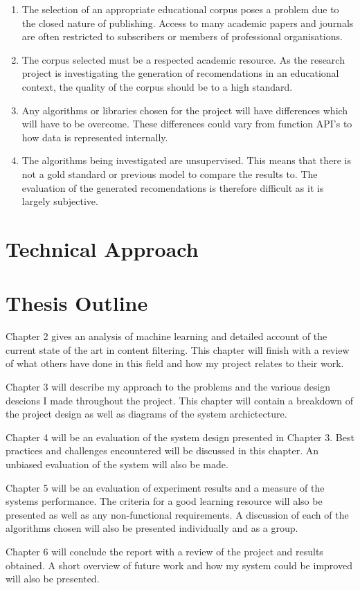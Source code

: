 \begin{enumerate}
    \item The selection of an appropriate educational corpus poses a problem due to the closed nature of publishing.
    Access to many academic papers and journals are often restricted to subscribers or members of professional organisations.

    \item The corpus selected must be a respected academic resource.
    As the research project is investigating the generation of recomendations in an educational context, the quality of the corpus should be to a high standard.

    \item Any algorithms or libraries chosen for the project will have differences which will have to be overcome.
    These differences could vary from function API's to how data is represented internally.

    \item The algorithms being investigated are unsupervised.
    This means that there is not a gold standard or previous model to compare the results to.
    The evaluation of the generated recomendations is therefore difficult as it is largely subjective.
\end{enumerate}

\section{Technical Approach}

\section{Thesis Outline}
Chapter 2 gives an analysis of machine learning and detailed account of the current state of the art in content filtering.
This chapter will finish with a review of what others have done in this field and how my project relates to their work.

Chapter 3 will describe my approach to the problems and the various design descions I made throughout the project.
This chapter will contain a breakdown of the project design as well as diagrams of the system archictecture.

Chapter 4 will be an evaluation of the system design presented in Chapter 3.
Best practices and challenges encountered will be discussed in this chapter.
An unbiased evaluation of the system will also be made.

Chapter 5 will be an evaluation of experiment results and a measure of the systems performance.
The criteria for a good learning resource will also be presented as well as any non-functional requirements.
A discussion of each of the algorithms chosen will also be presented individually and as a group.

Chapter 6 will conclude the report with a review of the project and results obtained.
A short overview of future work and how my system could be improved will also be presented.

